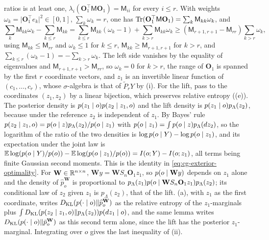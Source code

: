 ratios is at least one, \(\lambda_i(\mathbf O_1^\top\mathsf M\mathbf O_1)=\mathsf M_{ii}\)
for every \(i\leq r\). With weights \(\omega_k=\lvert\mathbf O_1^\top e_k\rvert^2\in[0,1]\),
\(\sum_k\omega_k=r\), one has
\(\operatorname{Tr}(\mathbf O_1^\top\mathsf M\mathbf O_1)=\sum_k\mathsf M_{kk}\omega_k\), and
\begin{equation}
\sum_k\mathsf M_{kk}\omega_k-\sum_{k\leq r}\mathsf M_{kk}
=\sum_{k\leq r}\mathsf M_{kk}(\omega_k-1)+\sum_{k>r}\mathsf M_{kk}\omega_k
\geq\left(\mathsf M_{r+1,r+1}-\mathsf M_{rr}\right)\sum_{k>r}\omega_k ,
\end{equation}
using \(\mathsf M_{kk}\leq\mathsf M_{rr}\) and \(\omega_k\leq1\) for \(k\leq r\),
\(\mathsf M_{kk}\geq\mathsf M_{r+1,r+1}\) for \(k>r\), and
\(\sum_{k\leq r}(\omega_k-1)=-\sum_{k>r}\omega_k\). The left side vanishes by the
equality of eigenvalues and \(\mathsf M_{r+1,r+1}>\mathsf M_{rr}\), so
\(\omega_k=0\) for \(k>r\), the range of \(\mathbf O_1\) is spanned by the first
\(r\) coordinate vectors, and \(z_1\) is an invertible linear function of
\((c_1,\ldots,c_r)\), whose \(\sigma\)-algebra is that of \(\widetilde P_rY\) by
(i). For the lift, pass to the coordinates \((z_1,z_2)\) by a linear bijection,
which preserves relative entropy ((e)). The
posterior density is \(p(z_1\mid o)p(z_2\mid z_1,o)\) and the lift density is
\(p(z_1\mid o)p_\Lambda(z_2)\), because under the reference \(z_2\) is independent
of \(z_1\). By Bayes' rule
\(p(z_2\mid z_1,o)=p(o\mid z)p_\Lambda(z_2)/p(o\mid z_1)\) with
\(p(o\mid z_1)=\int p(o\mid z)p_\Lambda(dz_2)\), so the logarithm of the ratio
of the two densities is \(\log p(o\mid Y)-\log p(o\mid z_1)\), and its
expectation under the joint law is
\(\mathbb E\log(p(o\mid Y)/p(o))-\mathbb E\log(p(o\mid z_1)/p(o))=I(o;Y)-I(o;z_1)\), all
terms being finite Gaussian second moments. This is the identity in
\eqref{eq:cg-exterior-optimality}. For \(\mathbf W\in\mathbb R^{n\times n}\),
\(\mathbf Wy=\mathbf WS_n\mathbf O_1z_1\), so \(p(o\mid\mathbf Wy)\) depends on \(z_1\)
alone and the density of \(\widehat p^{\mathbf W}_o\) is proportional to
\(p_\Lambda(z_1)p(o\mid\mathbf WS_n\mathbf O_1z_1)p_\Lambda(z_2)\); its conditional
law of \(z_2\) given \(z_1\) is \(p_\Lambda(z_2)\), that of the lift.
(a), with \(z_1\) as the first coordinate, writes
\(D_{\mathrm{KL}}(p(\cdot\mid o)\Vert\widehat p^{\mathbf W}_o)\) as the relative entropy of the
\(z_1\)-marginals plus
\(\int D_{\mathrm{KL}}(p(z_2\mid z_1,o)\Vert p_\Lambda(z_2))p(dz_1\mid o)\), and the same
lemma writes \(D_{\mathrm{KL}}(p(\cdot\mid o)\Vert\bar p^{\mathbf W}_o)\) as this second term
alone, since the lift has the posterior \(z_1\)-marginal. Integrating over \(o\)
gives the last inequality of (ii).

